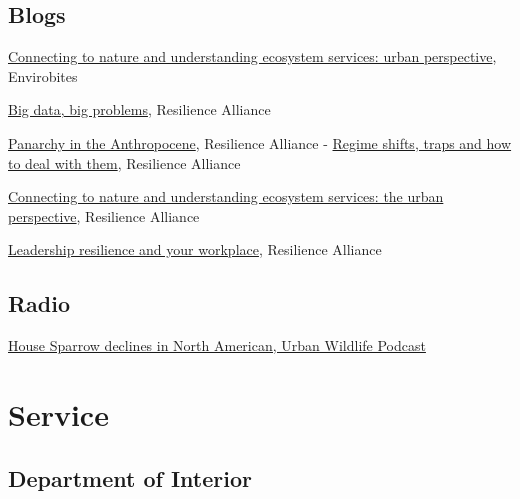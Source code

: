 \documentclass[11pt,]{article}
\providecommand{\tightlist}{%
  \setlength{\itemsep}{0pt}\setlength{\parskip}{0pt}}
\renewenvironment{itemize}{
 \begin{list}{• }{
   \setlength{\leftmargin}{2.5em}
\setlist{before=\setlength{\rightmargin}{\leftmargin}}
   \setlength{\itemsep}{0pt}
 }
}{
 \end{list}
}
\begin{document}
\hypertarget{blogs}{%
\subsection{Blogs}\label{blogs}}

\begin{itemize}
\tightlist
\item
  \href{https://envirobites.org/2017/10/17/connecting-to-nature-and-understanding-ecosystem-services-the-urban-perspective/}{Connecting
  to nature and understanding ecosystem services: urban perspective},
  Envirobites
\item
  \href{http://resilience2017.org/blog/big-data-big-problems/}{Big data,
  big problems}, Resilience Alliance
\item
  \href{http://resilience2017.org/blog/panarchy-in-the-anthropocene/}{Panarchy
  in the Anthropocene}, Resilience Alliance -
  \href{http://resilience2017.org/blog/regime-shifts-traps-and-how-to-deal-with-them/}{Regime
  shifts, traps and how to deal with them}, Resilience Alliance
\item
  \href{http://resilience2017.org/blog/connecting-to-nature-and-understanding-ecosystem-services-the-urban-perspective/}{Connecting
  to nature and understanding ecosystem services: the urban
  perspective}, Resilience Alliance
\item
  \href{http://resilience2017.org/blog/leadership-resilience-and-your-workplace/}{Leadership
  resilience and your workplace}, Resilience Alliance
\end{itemize}

\hypertarget{radio}{%
\subsection{Radio}\label{radio}}

\begin{itemize}
\tightlist
\item
  \href{http://www.urbanwildlifecast.com/?p=139}{House Sparrow declines
  in North American, Urban Wildlife Podcast}
\end{itemize}

\hypertarget{service}{%
\section{Service}\label{service}}

\hypertarget{department-of-interior}{%
\subsection{Department of Interior}\label{department-of-interior}}
\end{document}
